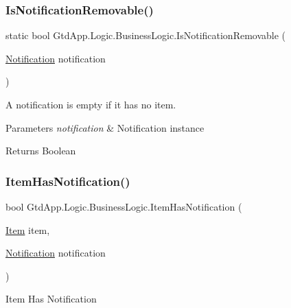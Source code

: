 \subsubsection{\texorpdfstring{Is\+Notification\+Removable()}{IsNotificationRemovable()}}
{\footnotesize\ttfamily static bool Gtd\+App.\+Logic.\+Business\+Logic.\+Is\+Notification\+Removable (\begin{DoxyParamCaption}\item[{\mbox{\hyperlink{class_gtd_app_1_1_data_1_1_notification}{Notification}}}]{notification }\end{DoxyParamCaption})\hspace{0.3cm}{\ttfamily [static]}}



A notification is empty if it has no item. 


\begin{DoxyParams}{Parameters}
{\em notification} & Notification instance\\
\hline
\end{DoxyParams}
\begin{DoxyReturn}{Returns}
Boolean
\end{DoxyReturn}
\mbox{\label{class_gtd_app_1_1_logic_1_1_business_logic_a57c1ed0fce56cce1be786e183b5bddd4}} 
\subsubsection{\texorpdfstring{Item\+Has\+Notification()}{ItemHasNotification()}}
{\footnotesize\ttfamily bool Gtd\+App.\+Logic.\+Business\+Logic.\+Item\+Has\+Notification (\begin{DoxyParamCaption}\item[{\mbox{\hyperlink{class_gtd_app_1_1_data_1_1_item}{Item}}}]{item,  }\item[{\mbox{\hyperlink{class_gtd_app_1_1_data_1_1_notification}{Notification}}}]{notification }\end{DoxyParamCaption})}



Item Has Notification 


